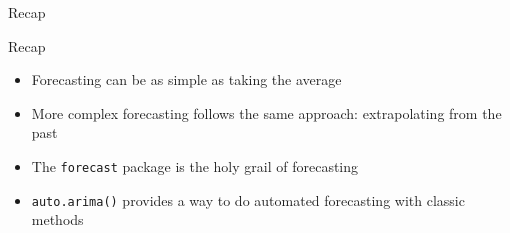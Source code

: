 \documentclass[ignorenonframetext,]{beamer}
\providecommand{\tightlist}{%
  \setlength{\itemsep}{0pt}\setlength{\parskip}{0pt}}
\begin{document}
\begin{frame}[fragile]{Recap}

\begin{block}{Recap}

\begin{itemize}
\tightlist
\item
  Forecasting can be as simple as taking the average
\item
  More complex forecasting follows the same approach: extrapolating from
  the past
\item
  The \texttt{forecast} package is the holy grail of forecasting
\item
  \texttt{auto.arima()} provides a way to do automated forecasting with
  classic methods
\end{itemize}

\end{block}

\end{frame}
\end{document}
